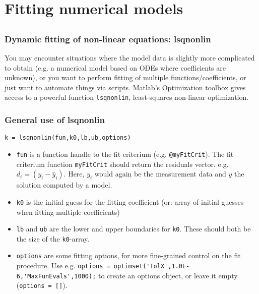 \section{Fitting numerical models}
\subsection*{}
\begin{frame}[fragile] 
  \frametitle{Dynamic fitting of non-linear equations: lsqnonlin}
  You may encounter situations where the model data is slightly more complicated to obtain (e.g. a numerical model based on ODEs where coefficients are unknown), or you want to perform fitting of multiple functions/coefficients, or just want to automate things via scripts. Matlab's Optimization toolbox gives access to a powerful function \lstinline$lsqnonlin$, least-squares non-linear optimization.
\end{frame}
  
\begin{frame}[fragile] 
  \frametitle{General use of lsqnonlin}
  \begin{lstlisting}
k = lsqnonlin(fun,k0,lb,ub,options)
  \end{lstlisting}
  \begin{itemize}
    \item \lstinline$fun$ is a function handle to the fit criterium (e.g. \lstinline$@myFitCrit$). The fit criterium function \lstinline$myFitCrit$ should return the residuals vector, e.g. $d_i = \left(y_i - \hat{y}_i\right)$. 
  Here, $y_i$ would again be the measurement data and $\hat{y}$ the solution computed by a model.
  \item \lstinline$k0$ is the initial guess for the fitting coefficient (or: array of initial guesses when fitting multiple coefficients)
  \item \lstinline$lb$ and \lstinline$ub$ are the lower and upper boundaries for \lstinline$k0$. These should both be the size of the \lstinline$k0$-array.
  \item \lstinline$options$ are some fitting options, for more fine-grained control on the fit procedure. Use e.g. \lstinline$options = optimset('TolX',1.0E-6,'MaxFunEvals',1000);$ to create an options object, or leave it empty (\lstinline$options = []$).
  \end{itemize}  
\end{frame}

